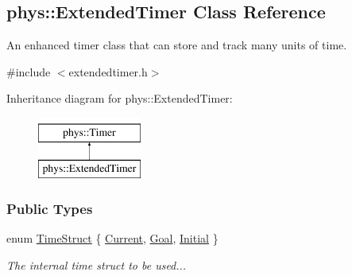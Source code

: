 \hypertarget{classphys_1_1ExtendedTimer}{
\subsection{phys::ExtendedTimer Class Reference}
\label{dc/d7c/classphys_1_1ExtendedTimer}
}


An enhanced timer class that can store and track many units of time.  




{\ttfamily \#include $<$extendedtimer.h$>$}

Inheritance diagram for phys::ExtendedTimer:\begin{figure}[H]
\begin{center}
\leavevmode
\includegraphics[height=2.000000cm]{dc/d7c/classphys_1_1ExtendedTimer}
\end{center}
\end{figure}
\subsubsection*{Public Types}
\begin{DoxyCompactItemize}
\item 
enum \hyperlink{classphys_1_1ExtendedTimer_a0f316e9347d1c118a157cc3c737c554b}{TimeStruct} \{ \hyperlink{classphys_1_1ExtendedTimer_a0f316e9347d1c118a157cc3c737c554bab42e601e90bdd3d9a40e8bd2203748f4}{Current}, 
\hyperlink{classphys_1_1ExtendedTimer_a0f316e9347d1c118a157cc3c737c554ba7179bcde29cd5fdda024ebe5f42207ae}{Goal}, 
\hyperlink{classphys_1_1ExtendedTimer_a0f316e9347d1c118a157cc3c737c554baca4dbfbcf56212e4df189c571d9718b3}{Initial}
 \}
\begin{DoxyCompactList}\small\item\em The internal time struct to be used... \item\end{DoxyCompactList}\end{DoxyCompactItemize}
